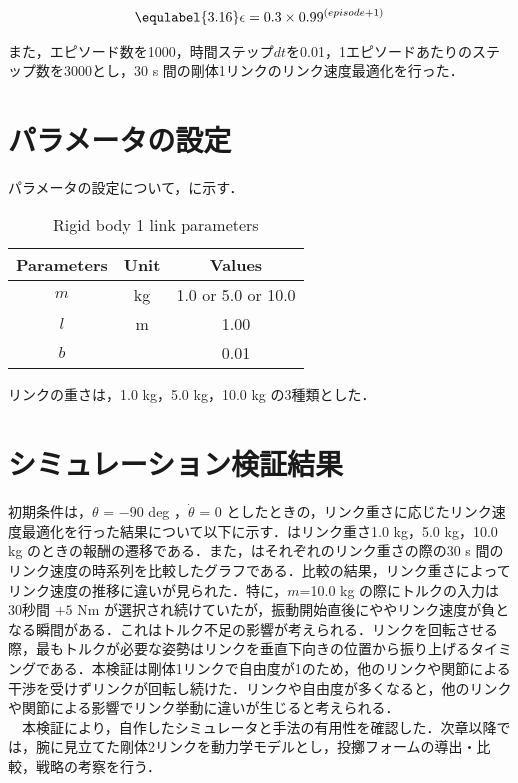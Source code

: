 \begin{eqnarray}
  \equlabel{3.16}
  \epsilon = 0.3 \times 0.99^{(episode + 1)}
\end{eqnarray}

また，エピソード数を1000，時間ステップ$dt$を0.01，1エピソードあたりのステップ数を3000とし，30 s 間の剛体1リンクのリンク速度最適化を行った．
\section{パラメータの設定}
パラメータの設定について，に示す．
\begin{table}[tb]
  \begin{center}
    \caption{Rigid body 1 link parameters}
    \begin{tabular}{c|c|c}
      \hline
      Parameters & Unit & Values \\
      \hline
      $m$ & kg & 1.0 or 5.0 or 10.0\\
      $l$ & m & 1.00 \\
      $b$ &  & 0.01 \\
      \hline
    \end{tabular}
  \end{center}
\end{table}
リンクの重さは，1.0 kg，5.0 kg，10.0 kg の3種類とした．
\section{シミュレーション検証結果}
初期条件は，$\theta$ = $-90$ deg ，$\dot{\theta}$ = 0 としたときの，リンク重さに応じたリンク速度最適化を行った結果について以下に示す．はリンク重さ1.0 kg，5.0 kg，10.0 kg のときの報酬の遷移である．また，はそれぞれのリンク重さの際の30 s 間のリンク速度の時系列を比較したグラフである．比較の結果，リンク重さによってリンク速度の推移に違いが見られた．特に，$m$=10.0 kg の際にトルクの入力は30秒間 $+ 5$ Nm が選択され続けていたが，振動開始直後にややリンク速度が負となる瞬間がある．これはトルク不足の影響が考えられる．リンクを回転させる際，最もトルクが必要な姿勢はリンクを垂直下向きの位置から振り上げるタイミングである．本検証は剛体1リンクで自由度が1のため，他のリンクや関節による干渉を受けずリンクが回転し続けた．リンクや自由度が多くなると，他のリンクや関節による影響でリンク挙動に違いが生じると考えられる．\\
　本検証により，自作したシミュレータと手法の有用性を確認した．次章以降では，腕に見立てた剛体2リンクを動力学モデルとし，投擲フォームの導出・比較，戦略の考察を行う．

